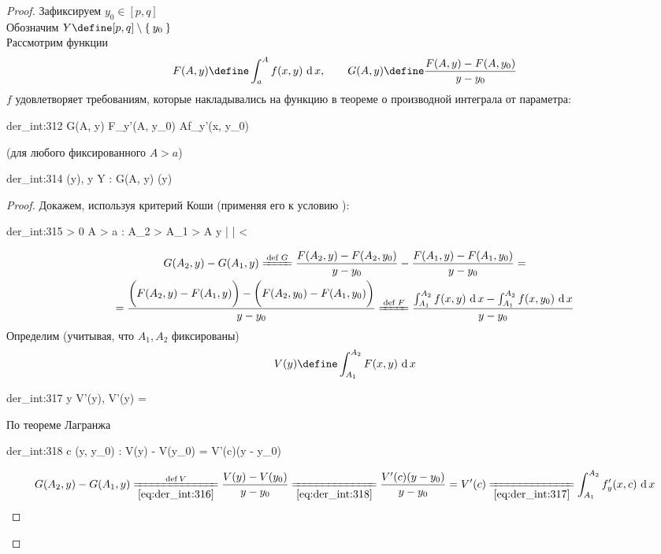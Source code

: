 \begin{proof}
	Зафиксируем $ y_0 \in [p, q] $ \\
	Обозначим $ Y \define [p, q] \setminus \set{y_0} $ \\
	Рассмотрим функции
	$$ F(A, y) \define \dint{a}A{f(x, y)}, \qquad G(A, y) \define \frac{F(A, y) - F(A, y_0)}{y - y_0} $$
	$ f $ удовлетворяет требованиям, которые накладывались на функцию в теореме о производной интеграла от параметра:
	\begin{equ}{der_int:312}
		\exist {} G(A, y) \bydef {}   F_y'(A, y_0)  A{f_y'(x, y_0)}
	\end{equ}
	(для любого фиксированного $ A > a $)
	\begin{statement}
		\begin{equ}{der_int:314}
			\exist \Phi(y), \quad y \in Y : \quad G(A, y)  \Phi(y)
		\end{equ}
	\end{statement}
	\begin{proof}
		Докажем, используя критерий Коши (применяя его к условию ):
		\begin{equ}{der_int:315}
			\forall \veps > 0 \quad \exist A > a : \quad \forall A_2 > A_1 > A \quad \forall y \in [p, q] \quad \bigg|  \bigg| < \veps
		\end{equ}
		\begin{multline}\lbl{der_int:316}
			G(A_2, y) - G(A_1, y) \bdefeq{G} \frac{F(A_2, y) - F(A_2, y_0)}{y - y_0} - \frac{F(A_1, y) - F(A_1, y_0)}{y - y_0} = \\
			= \frac{\bigg( F(A_2, y) - F(A_1, y) \bigg) - \bigg( F(A_2, y_0) - F(A_1, y_0) \bigg)}{y - y_0} \bdefeq{F} \frac{\dint{A_1}{A_2}{f(x, y)} - \dint{A_1}{A_2}{f(x, y_0)}}{y - y_0}
		\end{multline}
		Определим (учитывая, что $ A_1, A_2 $ фиксированы)
		$$ V(y) \define \dint{A_1}{A_2}{F(x, y)} $$
		\begin{equ}{der_int:317}
			\forall y \in [p, q] \quad \exist V'(y), \qquad V'(y) = 
		\end{equ}
		По теореме Лагранжа
		\begin{equ}{der_int:318}
			\exist c \in (y, \between y_0) : \quad V(y) - V(y_0) = V'(c)(y - y_0)
		\end{equ}
		$$ G(A_2, y) - G(A_1, y) \xlongequal[\eref{der_int:316}]{\operatorname{def} V} \frac{V(y) - V(y_0)}{y - y_0} \undereq{\eref{der_int:318}} \frac{V'(c)(y - y_0)}{y - y_0} = V'(c) \undereq{\eref{der_int:317}} \dint{A_1}{A_2}{f_y'(x, c)} $$

\end{proof}
\end{proof}
